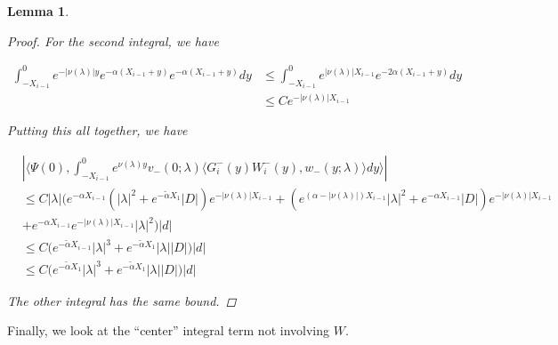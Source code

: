 \documentclass[12pt]{article}
\newtheorem{lemma}{Lemma}
\begin{document}
\begin{lemma}
\begin{proof}
For the second integral, we have

\begin{align*}
\int_{-X_{i-1}}^0 e^{-|\nu(\lambda)|y} e^{-\alpha(X_{i-1} + y)} e^{-\alpha(X_{i-1} + y)} dy &\leq \int_{-X_{i-1}}^0 e^{|\nu(\lambda)|X_{i-1}} e^{-2\alpha(X_{i-1} + y)}  dy \\
&\leq C e^{-|\nu(\lambda)|X_{i-1}}
\end{align*}

Putting this all together, we have

\begin{align*}
&\left| \langle \Psi(0), \int_{-X_{i-1}}^0
e^{\nu(\lambda)y} v_-(0; \lambda) \langle G_i^-(y)W_i^-(y), w_-(y; \lambda) \rangle dy \rangle \right| \\
&\leq C |\lambda| \Big( e^{-\alpha X_{i-1}} (|\lambda|^2 + e^{-\tilde{\alpha} X_1} |D|)e^{-|\nu(\lambda)|X_{i-1}} + (e^{(\alpha - |\nu(\lambda)|) X_{i-1}} |\lambda|^2 + e^{-\alpha X_{i-1}} |D|)e^{-|\nu(\lambda)|X_{i-1}} \\
&+ e^{-\alpha X_{i-1}} e^{-|\nu(\lambda)|X_{i-1}} |\lambda|^2 \Big) |d| \\
&\leq C \Big( e^{-\tilde{\alpha} X_{i-1}} |\lambda|^3 + e^{-\tilde{\alpha} X_1} |\lambda| |D| \Big) |d| \\
&\leq C \Big( e^{-\tilde{\alpha} X_1} |\lambda|^3 + e^{-\tilde{\alpha} X_1} |\lambda| |D| \Big) |d|
\end{align*}

The other integral has the same bound.

\end{proof}
\end{lemma}


Finally, we look at the ``center'' integral term not involving $W$.
\end{document}
